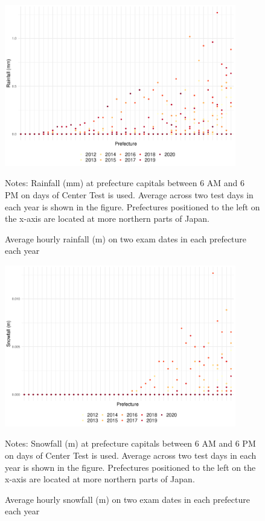 \documentclass[12pt,letterpaper]{article}
\begin{document}
\begin{figure}[H]
  \centering
  \caption{Average hourly rainfall (m) on two exam dates in each prefecture each year}
  \includegraphics[width = 0.9\textwidth]{../Output/images/rainfall_diff.pdf}
  \label{fig:rainfall_diff}
  \footnotesize
  \begin{tablenotes}
    \item Notes:
      Rainfall (mm) at prefecture capitals between 6 AM and 6 PM on days of Center Test is used.
      Average across two test days in each year is shown in the figure.
      Prefectures positioned to the left on the x-axis are located at more northern parts of Japan.
  \end{tablenotes}
\end{figure}

\begin{figure}[H]
  \centering
  \caption{Average hourly snowfall (m) on two exam dates in each prefecture each year}
  \includegraphics[width = 0.9\textwidth]{../Output/images/snowfall_diff.pdf}
  \label{fig:snowfall_diff}
  \footnotesize
  \begin{tablenotes}
    \item Notes:
      Snowfall (m) at prefecture capitals between 6 AM and 6 PM on days of Center Test is used.
      Average across two test days in each year is shown in the figure.
      Prefectures positioned to the left on the x-axis are located at more northern parts of Japan.
  \end{tablenotes}
\end{figure}
\end{document}
